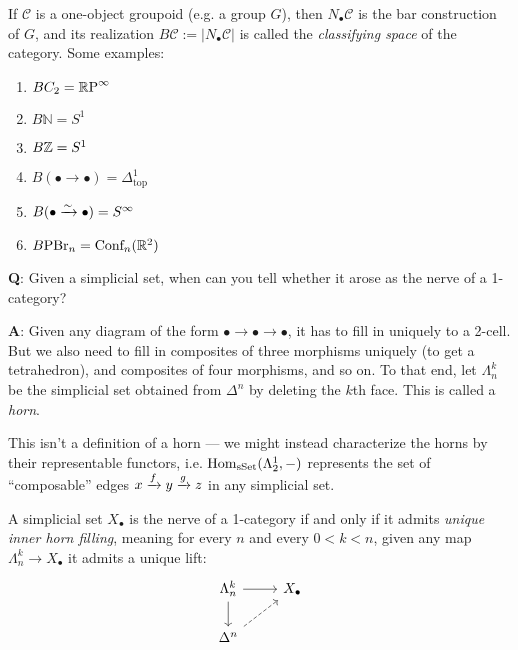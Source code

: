\documentclass[11pt]{amsart}
\begin{document}
\begin{example} If $\mathscr{C}$ is a one-object groupoid (e.g. a group $G$), then $N_\bullet \mathscr{C}$ is the bar construction of $G$, and its realization $B \mathscr{C} := |N_\bullet \mathscr{C}|$ is called the \textit{classifying space} of the category. Some examples:
\begin{enumerate}
    \item $BC_2 = {\mathbb{R}\text{P}}^\infty$
    \item $B \mathbb{N} = S^1$
    \item $B\mathbb{Z} = S^1$
    \item $B (\bullet \to \bullet) = \Delta^1_\text{top}$
    \item $B (\bullet \xrightarrow{\sim} \bullet) = S^\infty$
    \item $B\text{PBr}_n = \text{Conf}_n(\mathbb{R}^2)$
\end{enumerate}
\end{example}



\textbf{Q}: Given a simplicial set, when can you tell whether it arose as the nerve of a 1-category?

\textbf{A}: Given any diagram of the form $\bullet \to \bullet \to \bullet$, it has to fill in uniquely to a 2-cell. But we also need to fill in composites of three morphisms uniquely (to get a tetrahedron), and composites of four morphisms, and so on. To that end, let $\Lambda^k_n$ be the simplicial set obtained from $\Delta^n$ by deleting the $k$th face. This is called a \textit{horn}.

This isn't a definition of a horn --- we might instead characterize the horns by their representable functors, i.e. $\mathrm{Hom}_{\mathrm{sSet}}(\Lambda_2^1,-)$ represents the set of ``composable'' edges $x \xrightarrow{f} y \xrightarrow{g} z$ in any simplicial set.

\begin{proposition} A simplicial set $X_\bullet$ is the nerve of a 1-category if and only if it admits \textit{unique inner horn filling}, meaning for every $n$ and every $0 < k < n$, given any map $\Lambda^k_n \to X_\bullet$ it admits a unique lift:
\[ \begin{tikzcd}
    \Lambda^k_n\rar\dar & X_\bullet\\
    \Delta^n\ar[ur,dashed] & 
\end{tikzcd} \]
\end{proposition}
\end{document}
